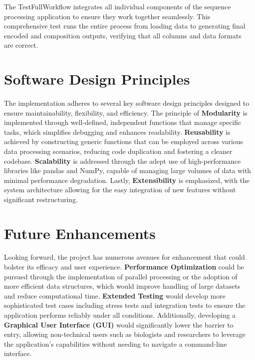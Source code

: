 \documentclass[12pt]{article}
\begin{document}
The TestFullWorkflow integrates all individual components of the sequence processing application to ensure they work together seamlessly. This comprehensive test runs the entire process from loading data to generating final encoded and composition outputs, verifying that all columns and data formats are correct. 

\section{Software Design Principles}
\paragraph{}
The implementation adheres to several key software design principles designed to ensure maintainability, flexibility, and efficiency. The principle of \textbf{Modularity} is implemented through well-defined, independent functions that manage specific tasks, which simplifies debugging and enhances readability. \textbf{Reusability} is achieved by constructing generic functions that can be employed across various data processing scenarios, reducing code duplication and fostering a cleaner codebase. \textbf{Scalability} is addressed through the adept use of high-performance libraries like pandas and NumPy, capable of managing large volumes of data with minimal performance degradation. Lastly, \textbf{Extensibility} is emphasized, with the system architecture allowing for the easy integration of new features without significant restructuring.

\section{Future Enhancements}
\paragraph{}
Looking forward, the project has numerous avenues for enhancement that could bolster its efficacy and user experience. \textbf{Performance Optimization} could be pursued through the implementation of parallel processing or the adoption of more efficient data structures, which would improve handling of large datasets and reduce computational time. \textbf{Extended Testing} would develop more sophisticated test cases including stress tests and integration tests to ensure the application performs reliably under all conditions. Additionally, developing a \textbf{Graphical User Interface (GUI)} would significantly lower the barrier to entry, allowing non-technical users such as biologists and researchers to leverage the application’s capabilities without needing to navigate a command-line interface.
\end{document}
